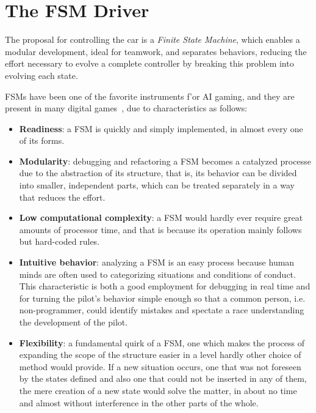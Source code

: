 \section{The FSM Driver}
The proposal for controlling the car is a \emph{Finite State Machine}, which
enables a modular development, ideal for teamwork, and separates behaviors, reducing
the effort necessary to evolve a complete controller by breaking this problem into
evolving each state.

FSMs have been one of the favorite instruments f'or AI gaming, and they are present 
in many digital games~\cite{buckland2005}, due to characteristics as follows:

\begin{itemize}
	\item \textbf{Readiness}: a FSM is quickly and simply implemented, in almost every one of its forms.
	
	\item \textbf{Modularity}: debugging and refactoring a FSM becomes a catalyzed processe due to the abstraction of its
	structure, that is, its behavior can be divided into smaller, independent parts, which can be treated separately
	in a way that reduces the effort.
	
	\item \textbf{Low computational complexity}: a FSM would hardly ever require great amounts of processor time, and
	that is because its operation mainly follows but hard-coded rules.
	
	\item \textbf{Intuitive behavior}: analyzing a FSM is an easy process because human minds are often used to
	categorizing situations and conditions of conduct. This characteristic is both a good employment for debugging in
	real time and for turning the pilot's behavior simple enough so that a common person, i.e. non-programmer, could
	identify mistakes and spectate a race understanding the development of the pilot.
	
	\item \textbf{Flexibility}: a fundamental quirk of a FSM, one which makes the process of expanding the scope of the
	structure easier in a level hardly other choice of method would provide. If a new situation occurs, one that was
	not foreseen by the states defined and also one that could not be inserted in any of them, the mere creation of a
	new state would solve the matter, in about no time and almost without interference in the other parts of the whole.
\end{itemize}

